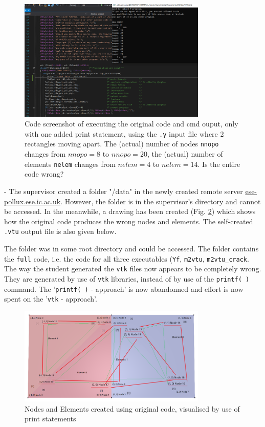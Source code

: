 \begin{figure}[!h]
	\centering
	\includegraphics[width=0.8\textwidth]{nodeschange.PNG}
	\caption{Code screenshot of executing the original code and cmd ouput, only with one added print statement, using the \texttt{.y} input file where 2 rectangles moving apart. The (actual) number of nodes \texttt{nnopo} changes from $nnopo=8$ to $nnopo=20$, the (actual) number of elements \texttt{nelem} changes from $nelem=4$ to $nelem=14$. Is the entire code wrong?}
	\label{fig:geometry2}
\end{figure}

\bigbreak
{} - {\color{blue}\textbf{}}
The supervisor created a folder "/data" in the newly created remote server \url{ese-pollux.ese.ic.ac.uk}. However, the folder is in the supervisor's directory and cannot be accessed. In the meanwhile, a drawing has been created (Fig. \ref{fig:node_ele_drawn}) which shows how the original code produces the wrong nodes and elements. The self-created \texttt{.vtu} output file is also given below.

\bigbreak
The folder was in some root directory and could be accessed. The folder contains the \texttt{full} code, i.e. the code for all three executables (\texttt{Yf}, \texttt{m2vtu}, \texttt{m2vtu\_crack}. The way the student generated the \texttt{vtk} files now appears to be completely wrong. They are generated by use of \texttt{vtk} libraries, instead of by use of the \texttt{printf( )} command. The '\texttt{printf( )} - approach' is now abandonned and effort is now spent on the '\texttt{vtk} - approach'.

\begin{figure}[!h]
	\centering
	\includegraphics[width=0.8\textwidth]{rectangles_drawn.PNG}
	\caption{Nodes and Elements created using original code, visualised by use of print statements}
	\label{fig:node_ele_drawn}
\end{figure}

